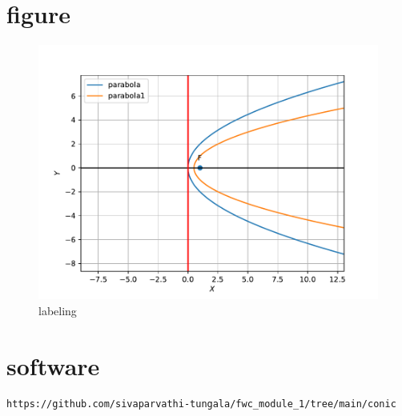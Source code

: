 \documentclass[journal,12pt,twocolumn]{IEEEtran}
\begin{document}
\section{\textbf{figure}}
\begin{figure}[h]
    \centering
\includegraphics[width=\columnwidth]{cofig.pdf}
\caption{labeling}
    \label{fig:my_label}
\end{figure}

\section{\textbf{software}}
\begin{lstlisting}
https://github.com/sivaparvathi-tungala/fwc_module_1/tree/main/conic
\end{lstlisting}
\end{document}
